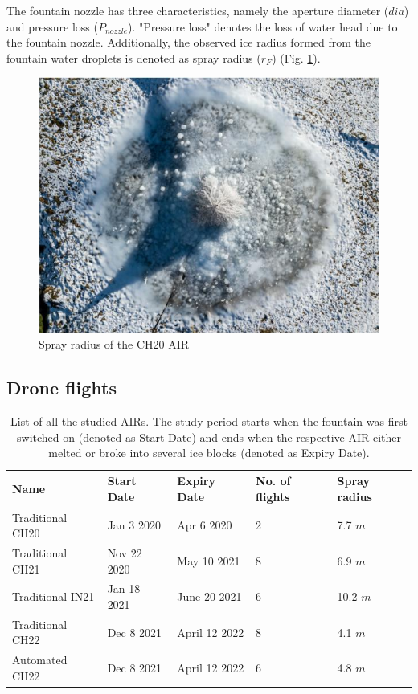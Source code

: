The fountain nozzle has three characteristics, namely the aperture diameter ($dia$) and pressure loss
($P_{nozzle}$). "Pressure loss" denotes the loss of water head due to the fountain nozzle. Additionally,
the observed ice radius formed from the fountain water droplets is denoted as spray radius ($r_F$) (Fig.
\ref{fig:CH20_rad}).

\begin{figure}[htb]
	\centering
	\includegraphics[width=\textwidth/2]{figs/CH20_sprayrad.jpg}
	\caption{Spray radius of the CH20 AIR }
	\label{fig:CH20_rad}
\end{figure}

\subsection{Drone flights}

\begin{table}
	\centering
	\caption{List of all the studied \ac{AIRs}. The study period starts when the fountain was first switched on
		(denoted as Start Date) and ends when the respective AIR either melted or broke into several ice blocks
		(denoted as Expiry Date). }
	\label{tab:AIRs}
	\begin{tabular}{|lllll|}
		\hline
		\textbf{Name}    & \textbf{Start Date} & \textbf{Expiry Date} & \textbf{No. of flights} & \textbf{Spray
		radius}                                                                                                 \\ \hline
		Traditional CH20 & Jan 3 2020          & Apr 6 2020           & 2                       & 7.7 $m$       \\
		Traditional CH21 & Nov 22 2020         & May 10 2021          & 8                       & 6.9 $m$       \\
		Traditional IN21 & Jan 18 2021         & June 20 2021         & 6                       & 10.2 $m$      \\
		Traditional CH22 & Dec 8 2021          & April 12 2022        & 8                       & 4.1 $m$       \\
		Automated CH22   & Dec 8 2021          & April 12 2022        & 6                       & 4.8 $m$       \\ \hline
	\end{tabular}
\end{table}


